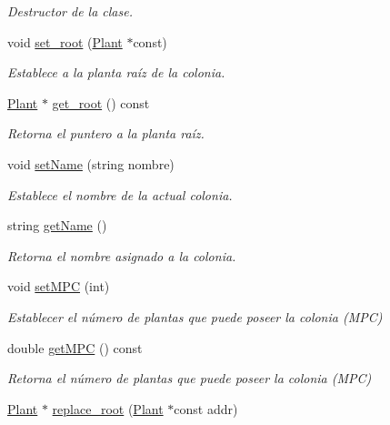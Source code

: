 \begin{DoxyCompactItemize}
\begin{DoxyCompactList}\small\item\em Destructor de la clase. \end{DoxyCompactList}\item 
void \hyperlink{class_colony_a23cb5efacc701479fb4cfdb3cfd5fdc5}{set\+\_\+root} (\hyperlink{class_plant}{Plant} $\ast$const)
\begin{DoxyCompactList}\small\item\em Establece a la planta raíz de la colonia. \end{DoxyCompactList}\item 
\hyperlink{class_plant}{Plant} $\ast$ \hyperlink{class_colony_afb7f538de55475561a46f8d4c2c65c8b}{get\+\_\+root} () const 
\begin{DoxyCompactList}\small\item\em Retorna el puntero a la planta raíz. \end{DoxyCompactList}\item 
void \hyperlink{class_colony_a29b64da9f582127b41616466c0b6232c}{set\+Name} (string nombre)
\begin{DoxyCompactList}\small\item\em Establece el nombre de la actual colonia. \end{DoxyCompactList}\item 
string \hyperlink{class_colony_aeb93331a87786184e3373f63ab643462}{get\+Name} ()
\begin{DoxyCompactList}\small\item\em Retorna el nombre asignado a la colonia. \end{DoxyCompactList}\item 
void \hyperlink{class_colony_ac31cfb633a10ab2e348d6a1a927c68d9}{set\+M\+P\+C} (int)
\begin{DoxyCompactList}\small\item\em Establecer el número de plantas que puede poseer la colonia (M\+P\+C) \end{DoxyCompactList}\item 
double \hyperlink{class_colony_a73d51b415918b9f0f123240a6f2101b5}{get\+M\+P\+C} () const 
\begin{DoxyCompactList}\small\item\em Retorna el número de plantas que puede poseer la colonia (M\+P\+C) \end{DoxyCompactList}\item 
\hyperlink{class_plant}{Plant} $\ast$ \hyperlink{class_colony_ac47cd3350e58715470ebadbf0a0e4eaf}{replace\+\_\+root} (\hyperlink{class_plant}{Plant} $\ast$const addr)

\end{DoxyCompactItemize}

